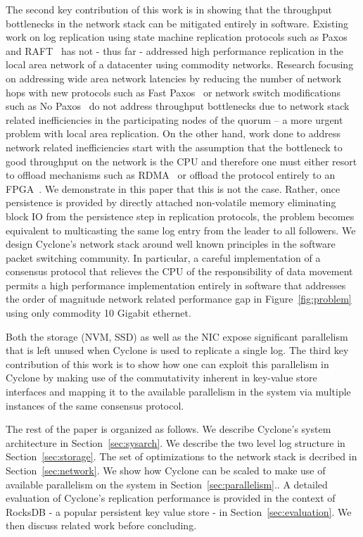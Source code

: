 \documentclass[pageno]{jpaper}
\begin{document}
The second key contribution of this work is in showing that the throughput
bottlenecks in the network stack can be mitigated entirely in software. Existing
work on log replication using state machine replication protocols such as
Paxos~\cite{paxos} and RAFT~\cite{raft} has not - thus far - addressed high
performance replication in the local area network of a datacenter using
commodity networks.  Research focusing on addressing wide area network latencies
by reducing the number of network hops with new protocols such as Fast
Paxos~\cite{fast-paxos} or network switch modifications such as No
Paxos~\cite{nopaxos} do not address throughput bottlenecks due to network stack
related inefficiencies in the participating nodes of the quorum -- a more urgent
problem with local area replication. On the other hand, work done to address
network related inefficiencies start with the assumption that the bottleneck to
good throughput on the network is the CPU and therefore one must either resort
to offload mechanisms such as RDMA~\cite{dare, farm, faast} or offload the
protocol entirely to an FPGA~\cite{consensus_box}. We demonstrate in this paper
that this is not the case. Rather, once persistence is provided by directly
attached non-volatile memory eliminating block IO from the persistence step in
replication protocols, the problem becomes equivalent to multicasting the same
log entry from the leader to all followers. We design Cyclone's network stack
around well known principles in the software packet switching community. In
particular, a careful implementation of a consensus protocol that relieves the
CPU of the responsibility of data movement permits a high performance
implementation entirely in software that addresses the order of magnitude
network related performance gap in Figure~\ref{fig:problem} using only commodity
10 Gigabit ethernet.

Both the storage (NVM, SSD) as well as the NIC expose significant parallelism
that is left unused when Cyclone is used to replicate a single log. The third
key contribution of this work is to show how one can exploit this parallelism in
Cyclone by making use of the commutativity inherent in key-value store
interfaces and mapping it to the available parallelism in the system via
multiple instances of the same consensus protocol.

The rest of the paper is organized as follows. We describe Cyclone's system
architecture in Section~\ref{sec:sysarch}. We describe the two level log
structure in Section~\ref{sec:storage}. The set of optimizations to the network
stack is decribed in Section~\ref{sec:network}. We show how Cyclone can be
scaled to make use of available parallelism on the system in
Section~\ref{sec:parallelism}..  A detailed evaluation of Cyclone's replication
performance is provided in the context of RocksDB - a popular persistent key
value store - in Section~\ref{sec:evaluation}. We then discuss related work
before concluding.
\end{document}
